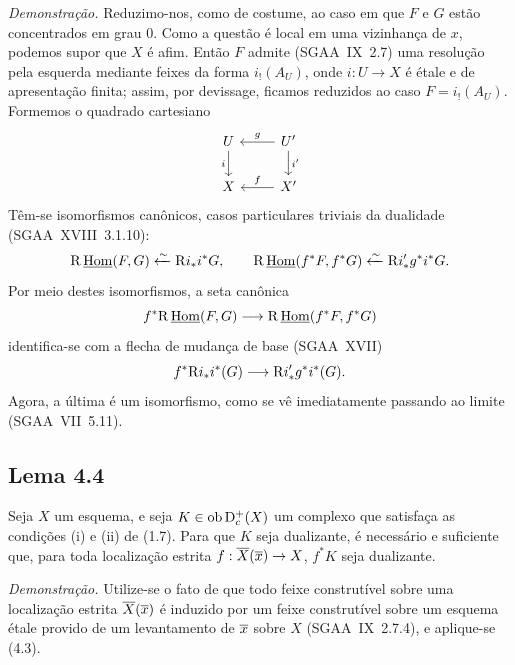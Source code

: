 \emph{Demonstração.} Reduzimo-nos, como de costume, ao caso em que $F$ e $G$ estão concentrados em grau $0$. Como a questão é local em uma vizinhança de $x$, podemos supor que $X$ é afim. Então $F$ admite (SGAA~IX~2.7) uma resolução pela esquerda mediante feixes da forma $i_!(A_U)$, onde $i : U \to X$ é étale e de apresentação finita; assim, por devissage, ficamos reduzidos ao caso $F = i_!(A_U)$. Formemos o quadrado cartesiano
\[
\begin{tikzcd}
U \arrow[d,"i"'] & U' \arrow[l,"g"'] \arrow[d,"i'"] \\
X & X' \arrow[l,"f"']
\end{tikzcd}
\]
Têm-se isomorfismos canônicos, casos particulares triviais da dualidade (SGAA~XVIII~3.1.10):
\[
\mathrm{R}\,\underline{\operatorname{Hom}}(F,G)\xleftarrow{\sim}\mathrm{R} i_* i^*G,
\qquad
\mathrm{R}\,\underline{\operatorname{Hom}}(f^*F,f^*G)\xleftarrow{\sim}\mathrm{R} i'_* g^*i^*G.
\]
Por meio destes isomorfismos, a seta canônica
\[
f^*\mathrm{R}\,\underline{\operatorname{Hom}}(F,G)\longrightarrow \mathrm{R}\,\underline{\operatorname{Hom}}(f^*F,f^*G)
\]
identifica-se com a flecha de mudança de base (SGAA~XVII)
\[
f^*\mathrm{R} i_*i^*(G)\longrightarrow \mathrm{R} i'_*g^*i^*(G).
\]
Agora, a última é um isomorfismo, como se vê imediatamente passando ao limite (SGAA~VII~5.11).

\subsection*{Lema 4.4}
Seja $X$ um esquema, e seja $K \in \operatorname{ob} \mathrm{D}_c^+(X)$ um complexo que satisfaça as condições (i) e (ii) de (1.7). Para que $K$ seja dualizante, é necessário e suficiente que, para toda localização estrita $f : \overline{X}(\overline{x}) \to X$, $f^*K$ seja dualizante.

\emph{Demonstração.} Utilize-se o fato de que todo feixe construtível sobre uma localização estrita $\overline{X}(\overline{x})$ é induzido por um feixe construtível sobre um esquema étale provido de um levantamento de $\overline{x}$ sobre $X$ (SGAA~IX~2.7.4), e aplique-se (4.3).
